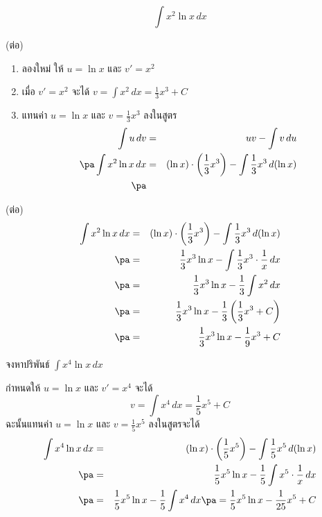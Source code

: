 \begin{frame}[t]
\[\int x^2 \ln x \, dx\]
\begin{sol} (ต่อ)
\begin{enumerate}
\item ลองใหม่ ให้ $u = \ln x$ และ $v' = x^2$ \pa
\item เมื่อ $v' = x^2$ \pa จะได้ $v = \int x^2 \, dx = \frac{1}{3}x^3 + C$ \pa
\item แทนค่า $u = \ln x$ และ $v = \frac{1}{3}x^3$ ลงในสูตร \pa
\begin{eqnarray*}
\int u \, dv &=& uv - \int v\, du \\ \pa
\int x^2 \ln x \, dx &=& (\ln x) \cdot \left( \frac{1}{3}x^3\right) - \int \frac{1}{3}x^3\, d (\ln x)\\ \pa
\end{eqnarray*}
\end{enumerate}
\end{sol}
\end{frame}

\begin{frame}
\begin{sol} (ต่อ)
\begin{eqnarray*}
\int x^2 \ln x \, dx &=& (\ln x) \cdot \left( \frac{1}{3}x^3\right) - \int \frac{1}{3}x^3\, d (\ln x)\\ \pa
&=& \frac{1}{3} x^3 \ln x - \int \frac{1}{3}x^3 \cdot \frac{1}{x}\, dx\\ \pa
&=& \frac{1}{3} x^3 \ln x - \frac{1}{3} \int x^2\, dx\\ \pa
&=& \frac{1}{3} x^3 \ln x - \frac{1}{3}\left( \frac{1}{3}x^3 + C \right)\\ \pa
&=& \frac{1}{3} x^3 \ln x - \frac{1}{9}x^3 + C
\end{eqnarray*}
\end{sol}
\end{frame}


\begin{frame}[t]
\begin{ex}
จงหาปริพันธ์ $\int x^4 \ln x \, dx$
\end{ex} \pa
\begin{sol}
กำหนดให้ $u = \ln x$ และ $v' = x^4$ จะได้ 
\[v = \int x^4 \, dx = \frac{1}{5}x^5 + C\]
ฉะนั้นแทนค่า $u = \ln x$ และ $v = \frac{1}{5}x^5$ ลงในสูตรจะได้
\begin{eqnarray*}
\int x^4 \ln x \, dx &=& (\ln x) \cdot \left( \frac{1}{5}x^5\right) - \int \frac{1}{5}x^5\, d (\ln x)\\ \pa
&=& \frac{1}{5} x^5 \ln x - \frac{1}{5} \int x^5 \cdot \frac{1}{x}\, dx\\ \pa
&=& \frac{1}{5} x^5 \ln x - \frac{1}{5} \int x^4\, dx\pa = \frac{1}{5} x^5 \ln x - \frac{1}{25}x^5 + C
\end{eqnarray*}
\end{sol}
\end{frame}


